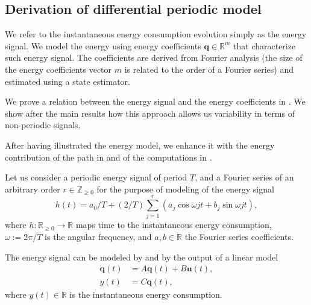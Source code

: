 \subsection{Derivation of differential periodic model}
\label{cp:model:periodic:diff-model}

We refer to the instantaneous energy consumption evolution simply as the energy signal. We model the energy using energy coefficients $\mathbf{q}\in\mathbb{R}^m$ that characterize such energy signal. The coefficients are derived from Fourier analysis (the size of the energy coefficients vector $m$ is related to the order of a Fourier series) and estimated using a state estimator. 

We prove a relation between the energy signal and the energy coefficients in . We show after the main results how this approach allows us variability in terms of non-periodic signals.

After having illustrated the energy model, we enhance it with the energy contribution of the path in and of the computations in . 

Let us consider a periodic energy signal of period $T$, and a Fourier series of an arbitrary order $r\in\mathbb{Z}_{\geq 0}$ for the purpose of modeling of the energy signal
\begin{equation}\label{eq:fourier}
  h(t)=a_0/T+(2/T)\sum_{j=1}^{r}{\left(a_j\cos{\omega jt}+b_j\sin{\omega jt}\right)},
\end{equation}
where $h:\mathbb{R}_{\geq 0}\rightarrow\mathbb{R}$ maps time to the instantaneous energy consumption, $\omega:=2\pi/T$ is the angular frequency, and $a,b\in\mathbb{R}$ the Fourier series coefficients.

The energy signal can be modeled by  and by the output of a linear model
\begin{subequations}\label{eq:state-perf}\begin{align}
  \dot{\mathbf{q}}(t)&=A\mathbf{q}(t)+B\mathbf{u}(t),\\
  y(t)&=C\mathbf{q}(t),
\end{align}\end{subequations}
where $y(t)\in\mathbb{R}$ is the instantaneous energy consumption. 

